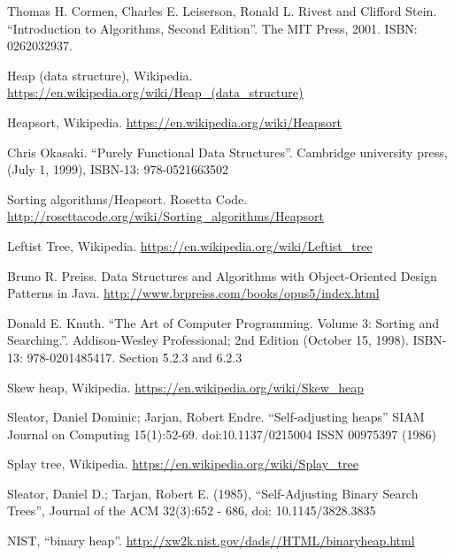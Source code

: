 \documentclass[b5paper]{article}
\begin{document}
\begin{thebibliography}{99}

Thomas H. Cormen, Charles E. Leiserson, Ronald L. Rivest and Clifford Stein. ``Introduction to Algorithms, Second Edition''. The MIT Press, 2001. ISBN: 0262032937.

Heap (data structure), Wikipedia. \url{https://en.wikipedia.org/wiki/Heap_(data_structure)}

Heapsort, Wikipedia. \url{https://en.wikipedia.org/wiki/Heapsort}

Chris Okasaki. ``Purely Functional Data Structures''. Cambridge university press, (July 1, 1999), ISBN-13: 978-0521663502

Sorting algorithms/Heapsort. Rosetta Code. \url{http://rosettacode.org/wiki/Sorting_algorithms/Heapsort}

Leftist Tree, Wikipedia. \url{https://en.wikipedia.org/wiki/Leftist_tree}

Bruno R. Preiss. Data Structures and Algorithms with Object-Oriented Design Patterns in Java. \url{http://www.brpreiss.com/books/opus5/index.html}

Donald E. Knuth. ``The Art of Computer Programming. Volume 3: Sorting and Searching.''. Addison-Wesley Professional;
2nd Edition (October 15, 1998). ISBN-13: 978-0201485417. Section 5.2.3 and 6.2.3

Skew heap, Wikipedia. \url{https://en.wikipedia.org/wiki/Skew_heap}

Sleator, Daniel Dominic; Jarjan, Robert Endre. ``Self-adjusting heaps'' SIAM Journal on Computing 15(1):52-69. doi:10.1137/0215004 ISSN 00975397 (1986)

Splay tree, Wikipedia. \url{https://en.wikipedia.org/wiki/Splay_tree}

Sleator, Daniel D.; Tarjan, Robert E. (1985), ``Self-Adjusting Binary Search Trees'', Journal of the ACM 32(3):652 - 686, doi: 10.1145/3828.3835

NIST, ``binary heap''. \url{http://xw2k.nist.gov/dads//HTML/binaryheap.html}

\end{thebibliography}

\ifx\wholebook\relax \else
\end{document}
